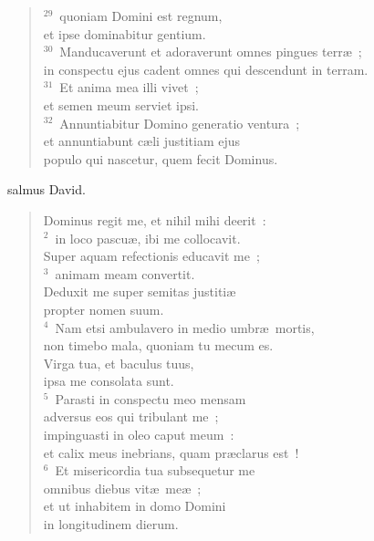\begin{flushleft}
\begin{verse}
${}^{29}$~quoniam Domini est regnum,\\ et ipse dominabitur gentium.\\
${}^{30}$~Manducaverunt et adoraverunt omnes pingues terr\ae~;\\ in conspectu ejus cadent omnes qui descendunt in terram.\\
${}^{31}$~Et anima mea illi vivet~;\\ et semen meum serviet ipsi.\\
${}^{32}$~Annuntiabitur Domino generatio ventura~;\\ et annuntiabunt c\ae li justitiam ejus\\ populo qui nascetur, quem fecit Dominus.\end{verse}\end{flushleft}



\bchapter
{}salmus David. \begin{flushleft}\begin{verse}\vspace{6pt}Dominus regit me, et nihil mihi deerit~:\\
${}^{2}$~in loco pascu\ae , ibi me collocavit.\\ Super aquam refectionis educavit me~;\\
${}^{3}$~animam meam convertit.\\ Deduxit me super semitas justiti\ae \\ propter nomen suum.\\
${}^{4}$~Nam etsi ambulavero in medio umbr\ae\ mortis,\\ non timebo mala, quoniam tu mecum es.\\ Virga tua, et baculus tuus,\\ ipsa me consolata sunt.\\
${}^{5}$~Parasti in conspectu meo mensam\\ adversus eos qui tribulant me~;\\ impinguasti in oleo caput meum~:\\ et calix meus inebrians, quam pr\ae clarus est~!\\
${}^{6}$~Et misericordia tua subsequetur me\\ omnibus diebus vit\ae\ me\ae~;\\ et ut inhabitem in domo Domini\\ in longitudinem dierum.\end{verse}\end{flushleft}



